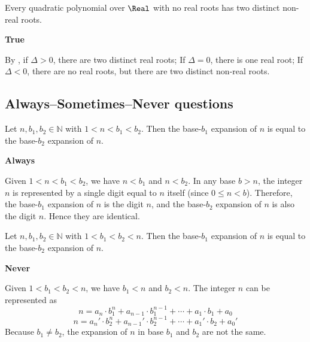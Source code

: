 \begin{chapex} %
\label{cqGettingStartedTFEnd}
Every quadratic polynomial over $\Real$ with no real roots has two distinct non-real roots.
\end{chapex}

\begin{mysolution}
    \textbf{True}

    By , if $\Delta > 0$, there are two distinct real roots; If $\Delta = 0$, there is one real root; If $\Delta < 0$, there are no real roots, but there are two distinct non-real roots.
\end{mysolution}

\subsection*{Always--Sometimes--Never questions}


\begin{chapex} %
\label{cqGettingStartedASNBegin}
Let $n,b_1,b_2 \in \mathbb{N}$ with $1 < n < b_1 < b_2$. Then the base-$b_1$ expansion of $n$ is equal to the base-$b_2$ expansion of $n$.
\end{chapex}

\begin{mysolution}
    \textbf{Always}

    Given $1 < n < b_1 < b_2$, we have $n < b_1$ and $n < b_2$. In any base $b>n$, the integer $n$ is represented by a single digit equal to $n$ itself (since $0 \le n < b$). Therefore, the base-$b_1$ expansion of $n$ is the digit $n$, and the base-$b_2$ expansion of $n$ is also the digit $n$. Hence they are identical.
\end{mysolution}

\begin{chapex} %
Let $n,b_1,b_2 \in \mathbb{N}$ with $1 < b_1 < b_2 < n$. Then the base-$b_1$ expansion of $n$ is equal to the base-$b_2$ expansion of $n$.
\end{chapex}

\begin{mysolution}
    \textbf{Never}

    Given $1 < b_1 < b_2 < n$, we have $b_1 < n$ and $b_2 < n$. The integer $n$ can be represented as
    \[n = a_n \cdot b_1^n + a_{n-1} \cdot b_1^{n-1} + \cdots + a_1 \cdot b_1 + a_0\]
    \[n = a_n' \cdot b_2^n + a_{n-1}' \cdot b_2^{n-1} + \cdots + a_1' \cdot b_2 + a_0' \] 
    Because $b_1 \ne b_2$, the expansion of $n$ in base $b_1$ and $b_2$ are not the same.
\end{mysolution}

